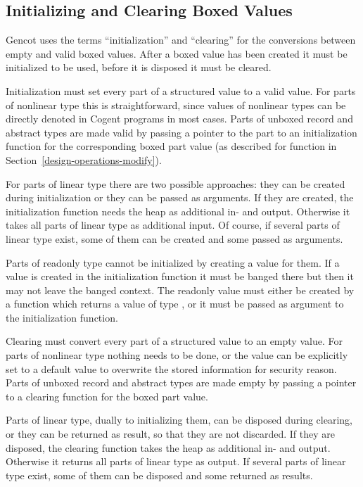 \subsection{Initializing and Clearing Boxed Values}
\label{design-operations-init}

Gencot uses the terms ``initialization'' and ``clearing'' for the conversions between empty and valid boxed values.
After a boxed value has been created it must be initialized to be used, before it is disposed it must be cleared.

Initialization must set every part of a structured value to a valid value. For parts of nonlinear type this is
straightforward, since values of nonlinear types can be directly denoted in Cogent programs in most cases. Parts
of unboxed record and abstract types are made valid by passing a pointer to the part to an initialization
function for the corresponding boxed part value (as described for function  in 
Section~\ref{design-operations-modify}).

For parts of linear type there are two possible approaches: they can be created during initialization 
or they can be passed as arguments. If they are created, the initialization function needs the heap as additional 
in- and output. Otherwise it takes all parts of linear type as additional input. Of course, if several parts
of linear type exist, some of them can be created and some passed as arguments.

Parts of readonly type  cannot be initialized by creating a value for them. If a value is created in the 
initialization function it must be banged there but then it may not leave the banged context. The readonly value 
must either be created by a function which returns a value of type , or it must be passed as argument
to the initialization function. 

Clearing must convert every part of a structured value to an empty value. For parts of nonlinear type nothing
needs to be done, or the value can be explicitly set to a default value to overwrite the stored information for
security reason. Parts of unboxed record and abstract types are made empty by passing a pointer to a clearing 
function for the boxed part value.

Parts of linear type, dually to initializing them, can be disposed during clearing, or they can be returned
as result, so that they are not discarded. If they are disposed, the clearing function takes the heap as 
additional in- and output. Otherwise it returns all parts of linear type as output. If several parts
of linear type exist, some of them can be disposed and some returned as results.

